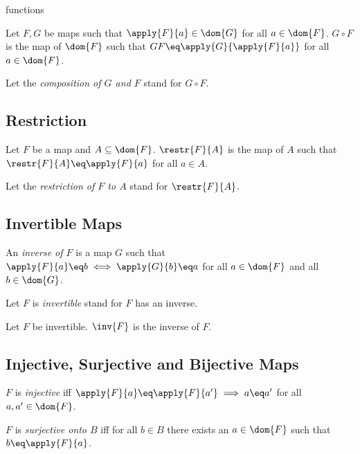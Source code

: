 \documentclass{naproche-library}
\begin{document}
\begin{smodule}{functions}
\begin{definition*}[forthel,id=CompositionDef]
  Let $F,G$ be maps such that $\apply{F}{a}\in\dom{G}$ for all $a\in\dom{F}$.
  $G\circ F$ is the map of $\dom{F}$ such that $G\circ F\eq\apply{G}{\apply{F}{a}}$ for all $a\in\dom{F}$.

  Let the \emph{composition of $G$ and $F$} stand for $G\circ F$.
\end{definition*}


\subsection{Restriction}

\begin{definition*}[forthel,id=RestrictionDef]
  Let $F$ be a map and $A\subseteq\dom{F}$.
  $\restr{F}{A}$ is the map of $A$ such that $\restr{F}{A}\eq \apply{F}{a}$ for all $a\in A$.

  Let the \emph{restriction of $F$ to $A$} stand for $\restr{F}{A}$.
\end{definition*}


\subsection{Invertible Maps}

\begin{definition*}[forthel,id=InvertibleDef]
  An \emph{inverse of $F$} is a map $G$ such that $\apply{F}{a}\eq b\iff \apply{G}{b}\eq a$ for all $a\in\dom{F}$ and all $b\in\dom{G}$.

  Let $F$ is \emph{invertible} stand for $F$ has an inverse.
\end{definition*}

\begin{definition*}[forthel,id=InverseMapDef]
  Let $F$ be invertible.
  $\inv{F}$ is the inverse of $F$.
\end{definition*}


\subsection{Injective, Surjective and Bijective Maps}

\begin{definition*}[forthel,id=InjectionDef]
  $F$ is \emph{injective} iff $\apply{F}{a}\eq\apply{F}{a'}\implies a\eq a'$ for all $a,a'\in\dom{F}$.
\end{definition*}

\begin{definition*}[forthel,id=SurjectionDef]
  $F$ is \emph{surjective onto $B$} iff for all $b\in B$ there exists an $a\in\dom{F}$ such that $b\eq \apply{F}{a}$.


\end{definition*}
\end{smodule}
\end{document}
